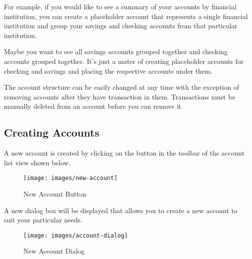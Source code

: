\documentclass[letterpaper,12pt]{book}
\begin{document}
    For example, if you would like to see a summary of your accounts by financial institution, you can create a placeholder
    account that represents a single financial institution and group your savings and checking accounts from that particular
    institution.

    Maybe you want to see all savings accounts grouped together and checking accounts grouped together.
    It's just a mater of creating placeholder accounts for checking and savings and placing the respective accounts under them.

    The account structure can be easily changed at any time with the exception of removing accounts after they have
    transaction in them.
    Transactions must be manually deleted from an account before you can remove it.

    \subsection{Creating Accounts}
    \label{subsec:creatingAccounts}
    A new account is created by clicking on the  button in the toolbar of the account list view shown below.

    \begin{figure}[h]
        \caption{New Account Button}
        \texttt{[image: images/new-account]}
    \end{figure}

    A new dialog box will be displayed that allows you to create a new account to suit your particular needs.

    \begin{figure}[H]
        \caption{New Account Dialog}
        \texttt{[image: images/account-dialog]}
    \end{figure}
\end{document}
